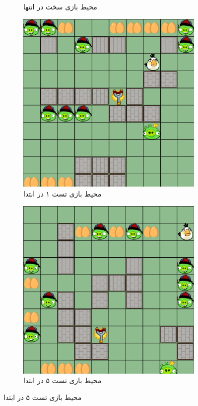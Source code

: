 \documentclass[11pt, a4paper, oneside]{article}
\begin{document}
\begin{figure}[H]
\begin{subfigure}{0.35\textwidth}
   		\caption{محیط بازی سخت در انتها}
   		\label{fig:b}
   	\end{subfigure}
   	
   	\medskip
   	\begin{subfigure}{0.35\textwidth}
   		\includegraphics[width=\textwidth]{./images/game_t1}
   		\caption{محیط بازی تست ۱ در ابتدا}
   		\label{fig:c}
   	\end{subfigure}
   	\hfill
   	\begin{subfigure}{0.35\textwidth}
   		\includegraphics[width=\textwidth]{./images/game_t5}
   		\caption{محیط بازی تست ۵ در ابتدا}
   		\label{fig:d}
   	\end{subfigure}
   	

\end{figure}
\end{document}
